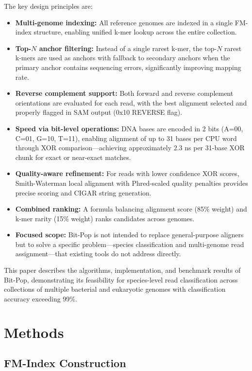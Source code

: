 \documentclass[utf8]{article}
\begin{document}
The key design principles are:
\begin{itemize}
    \item \textbf{Multi-genome indexing:} All reference genomes are indexed in a single FM-index structure, enabling unified k-mer lookup across the entire collection.
    \item \textbf{Top-$N$ anchor filtering:} Instead of a single rarest k-mer, the top-$N$ rarest k-mers are used as anchors with fallback to secondary anchors when the primary anchor contains sequencing errors, significantly improving mapping rate.
    \item \textbf{Reverse complement support:} Both forward and reverse complement orientations are evaluated for each read, with the best alignment selected and properly flagged in SAM output (0x10 REVERSE flag).
    \item \textbf{Speed via bit-level operations:} DNA bases are encoded in 2 bits (A=00, C=01, G=10, T=11), enabling alignment of up to 31 bases per CPU word through XOR comparison---achieving approximately 2.3 ns per 31-base XOR chunk for exact or near-exact matches.
    \item \textbf{Quality-aware refinement:} For reads with lower confidence XOR scores, Smith-Waterman local alignment with Phred-scaled quality penalties provides precise scoring and CIGAR string generation.
    \item \textbf{Combined ranking:} A formula balancing alignment score (85\% weight) and k-mer rarity (15\% weight) ranks candidates across genomes.
    \item \textbf{Focused scope:} Bit-Pop is not intended to replace general-purpose aligners but to solve a specific problem---species classification and multi-genome read assignment---that existing tools do not address directly.
\end{itemize}

This paper describes the algorithms, implementation, and benchmark results of Bit-Pop, demonstrating its feasibility for species-level read classification across collections of multiple bacterial and eukaryotic genomes with classification accuracy exceeding 99\%.

\section{Methods}

\subsection{FM-Index Construction}
\end{document}
